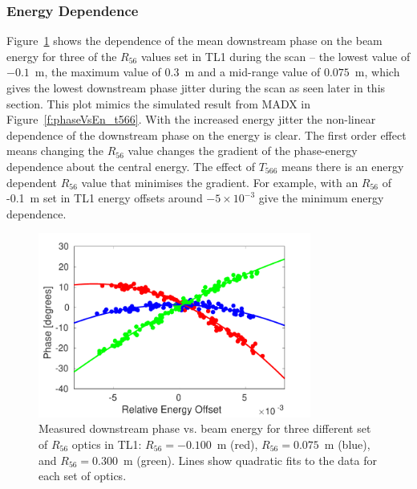 \subsubsection{Energy Dependence}

Figure~\ref{f:R56ScanGunWiggle_PhaseVsEnergy} shows the dependence of the mean downstream phase on the beam energy for three of the \(R_{56}\) values set in TL1 during the scan -- the lowest value of \(-0.1\)~m, the maximum value of \(0.3\)~m and a mid-range value of \(0.075\)~m, which gives the lowest downstream phase jitter during the scan as seen later in this section. This plot mimics the simulated result from MADX in Figure~\ref{f:phaseVsEn_t566}. With the increased energy jitter the non-linear dependence of the downstream phase on the energy is clear. The first order effect means changing the \(R_{56}\) value changes the gradient of the phase-energy dependence about the central energy. The effect of \(T_{566}\) means there is an energy dependent \(R_{56}\) value that minimises the gradient. For example, with an \(R_{56}\) of -0.1~m set in TL1 energy offsets around \(-5\times10^{-3}\) give the minimum energy dependence.

\begin{figure}
  \centering
  \includegraphics[width=0.8\textwidth]{Figures/propagation/R56ScanGunWiggle_PhaseVsEnergy}
  \caption{Measured downstream phase vs. beam energy for three different set of \(R_{56}\) optics in TL1: \(R_{56}=-0.100\)~m (red), \(R_{56}=0.075\)~m (blue), and \(R_{56}=0.300\)~m (green). Lines show quadratic fits to the data for each set of optics.}
  \label{f:R56ScanGunWiggle_PhaseVsEnergy}
\end{figure}

